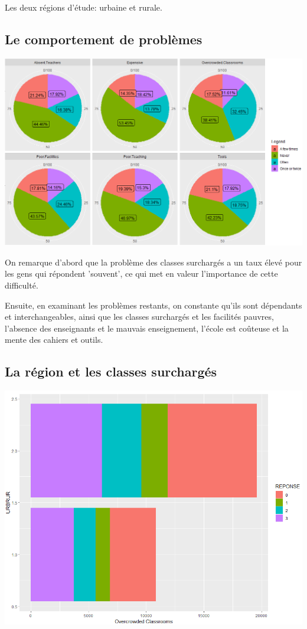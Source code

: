 \documentclass[a0, portrait]{a0poster}
\begin{document}
\begin{multicols}{3}
Les deux régions d'étude: urbaine et rurale.

\subsection*{Le comportement de problèmes}
\begin{center}\vspace{1cm}
\includegraphics[width=0.8\linewidth]{fig_6_pie.png}
\end{center}\vspace{1cm}

On remarque d'abord que la problème des classes surchargés a un taux élevé pour les gens qui répondent 'souvent', ce qui met en valeur l'importance de cette difficulté.

Ensuite, en examinant les problèmes restants, on constante qu'ils sont dépendants et interchangeables, ainsi que les classes surchargés et les facilités pauvres, l'absence des enseignants et le mauvais enseignement, l'école est coûteuse et la mente des cahiers et outils. 

\subsection*{La région et les classes surchargés}
\begin{center}\vspace{1cm}
\includegraphics[width=0.8\linewidth]{fig_classrooms_urbrur.png}
\end{center}\vspace{1cm}


\end{multicols}
\end{document}

